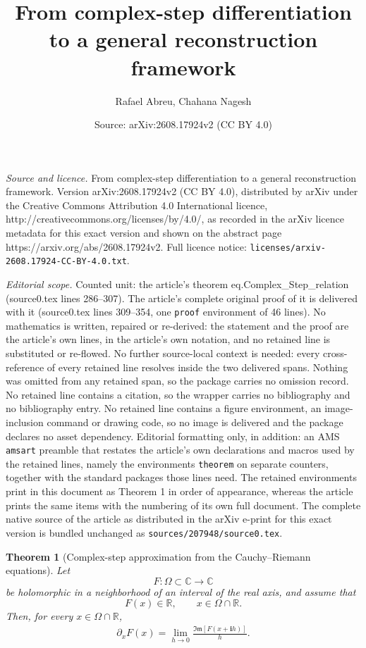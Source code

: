 \documentclass[10pt,a4paper]{amsart}
\title{From complex-step differentiation to a general reconstruction framework}
\author{Rafael Abreu, Chahana Nagesh}
\date{Source: arXiv:2608.17924v2 (CC BY 4.0)}
\newtheorem{theorem}{Theorem}
\newcommand{\ImagPart}{\mathfrak{Im}}
\newcommand{\imag}{\textbf{i}}
\begin{document}
\maketitle

\noindent\emph{Source and licence.} From complex-step differentiation to a general reconstruction framework. Version arXiv:2608.17924v2 (CC BY 4.0), distributed by arXiv under the Creative Commons Attribution 4.0 International licence, http://creativecommons.org/licenses/by/4.0/, as recorded in the arXiv licence metadata for this exact version and shown on the abstract page https://arxiv.org/abs/2608.17924v2. Full licence notice: \texttt{licenses/arxiv-2608.17924-CC-BY-4.0.txt}.\par\smallskip

\noindent\textit{Editorial scope.} Counted unit: the article's theorem eq.Complex\_Step\_relation (source0.tex lines 286--307). The article's complete original proof of it is delivered with it (source0.tex lines 309--354, one \texttt{proof} environment of 46 lines). No mathematics is written, repaired or re-derived: the statement and the proof are the article's own lines, in the article's own notation, and no retained line is substituted or re-flowed.  No further source-local context is needed: every cross-reference of every retained line resolves inside the two delivered spans.  Nothing was omitted from any retained span, so the package carries no omission record.  No retained line contains a citation, so the wrapper carries no bibliography and no bibliography entry.  No retained line contains a figure environment, an image-inclusion command or drawing code, so no image is delivered and the package declares no asset dependency.  Editorial formatting only, in addition: an AMS \texttt{amsart} preamble that restates the article's own declarations and macros used by the retained lines, namely the environments \texttt{theorem} on separate counters, together with the standard packages those lines need.  The retained environments print in this document as Theorem 1 in order of appearance, whereas the article prints the same items with the numbering of its own full document.  The complete native source of the article as distributed in the arXiv e-print for this exact version is bundled unchanged as \texttt{sources/207948/source0.tex}.
	\begin{theorem}[Complex-step approximation from the Cauchy--Riemann equations]
		Let
		\[
		F:\Omega\subset\mathbb{C}\rightarrow\mathbb{C}
		\]
		be holomorphic in a neighborhood of an interval of the real axis, and assume that
		\[
		F(x)\in\mathbb{R},
		\qquad x\in\Omega\cap\mathbb{R}.
		\]
		Then, for every
		\(x\in\Omega\cap\mathbb{R}\),
		\begin{align}
			\partial_xF(x)
			=
			\lim_{h\rightarrow0}
			\frac{\ImagPart\!\left[F(x+\imag h)\right]}{h}.
			\label{eq.Complex_Step_relation}
		\end{align}
	\end{theorem}
\end{document}
